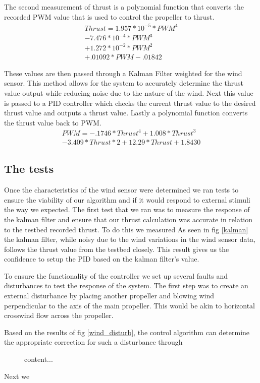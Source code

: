 \documentclass[twocolumn]{article}
\begin{document}
	The second measurement of thrust is a polynomial function that converts the recorded PWM value that is used to control the propeller to thrust. \newline
	\begin{eqnarray}
	Thrust = 1.957*10^{-5}*PWM^4 \\
	- 7.476*10^{-4}*PWM^3 \nonumber\\ 
	+ 1.272*10^{-2}*PWM^2 \nonumber\\
	+ .01092*PWM - .01842 \nonumber
	\label{pwm_poly}
	\end{eqnarray}
	
	These values are then passed through a Kalman Filter weighted for the wind sensor. This method allows for the system to accurately determine the thrust value output while reducing noise due to the nature of the wind. Next this value is passed to a PID controller which checks the current thrust value to the desired thrust value and outputs a thrust value. Lastly a polynomial function converts the thrust value back to PWM.
	\begin{eqnarray}
	PWM = -.1746*Thrust^4 + 1.008*Thrust^3\\ 
	- 3.409*Thrust*2 + 12.29*Thrust + 1.8430 \nonumber
	\label{pwm_poly}
	\end{eqnarray}
	\subsection{The tests}
	Once the characteristics of the wind sensor were determined we ran tests to ensure the viability of our algorithm and if it would respond to external stimuli the way we expected. The first test that we ran was to measure the response of the kalman filter and ensure that our thrust calculation was accurate in relation to the testbed recorded thrust. To do this we measured  As seen in fig \ref{kalman} the kalman filter, while noisy due to the wind variations in the wind sensor data, follows the thrust value from the testbed closely. This result gives us the confidence to setup the PID based on the kalman filter's value. 
	
	To ensure the functionality of the controller we set up several faults and disturbances to test the response of the system. The first step was to create an external disturbance by placing another propeller and blowing wind perpendicular to the axis of the main propeller. This would be akin to horizontal crosswind flow across the propeller.
	\begin{figure}
		\label{content...}
	\end{figure}
	 Based on the results of fig \ref{wind_disturb}, the control algorithm can determine the appropriate correction for such a disturbance through
	\begin{figure}
		content...
	\end{figure}
	Next we 
\end{document}
